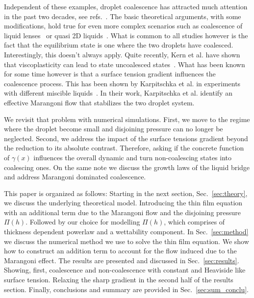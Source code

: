 \documentclass[twocolumn,amsmath,amssymb,showpacs,pre,nofootinbib,superscriptaddress]{revtex4-1} %
\begin{document}
Independent of these examples, droplet coalescence has attracted much attention in the past two decades, see refs.~\cite{eggers_lister_stone_1999, duchemin_eggers_josserand_2003, PhysRevLett.95.164503, PhysRevLett.106.114501, doi:10.1063/1.4828721}. 
The basic theoretical arguments, with some modifications, hold true for even more complex scenarios such as coalescence of liquid lenses~\cite{PhysRevLett.124.194502} or quasi 2D liquids~\cite{klopp2020self, doi:10.1021/acs.langmuir.0c02139}.
What is common to all studies however is the fact that the equilibrium state is one where the two droplets have coalesced.
Interestingly, this doesn't always apply.
Quite recently, Kern et al. have shown that viscoplasticity can lead to state uncoalesced states~\cite{https://doi.org/10.48550/arxiv.2203.15617}.
What has been known for some time however is that a surface tension gradient influences the coalescence process. 
This has been shown by Karpitschka et al. in experiments with different miscible liquids~\cite{PhysRevLett.109.066103, doi:10.1021/la500459v, karpitschka2014sharp, bruning2018delayed}.
In their work, Karpitschka et al. identify an effective Marangoni flow that stabilizes the two droplet system.

We revisit that problem with numerical simulations.
First, we move to the regime where the droplet become small and disjoining pressure can no longer be neglected.
Second, we address the impact of the surface tensions gradient beyond the reduction to its absolute contrast.
Therefore, asking if the concrete function of $\gamma(x)$ influences the overall dynamic and turn non-coalescing states into coalescing ones.
On the same note we discuss the growth laws of the liquid bridge and address Marangoni dominated coalescence.

This paper is organized as follows:
Starting in the next section, Sec.~\ref{sec:theory}, we discuss the underlying theoretical model.
Introducing the thin film equation with an additional term due to the Marangoni flow and the disjoining pressure $\Pi(h)$. 
Followed by our choice for modelling $\Pi(h)$, which comprises of thickness dependent powerlaw and a wettability component. 
In Sec.~\ref{sec:method} we discuss the numerical method we use to solve the thin film equation.
We show how to construct an addition term to account for the flow induced due to the Marangoni effect.
The results are presented and discussed in Sec.~\ref{sec:results}.
Showing, first, coalescence and non-coalescence with constant and Heaviside like surface tension.
Relaxing the sharp gradient in the second half of the results section.
Finally, conclusions and summary are provided in Sec.~\ref{sec:sum_conclu}. 
\end{document}
